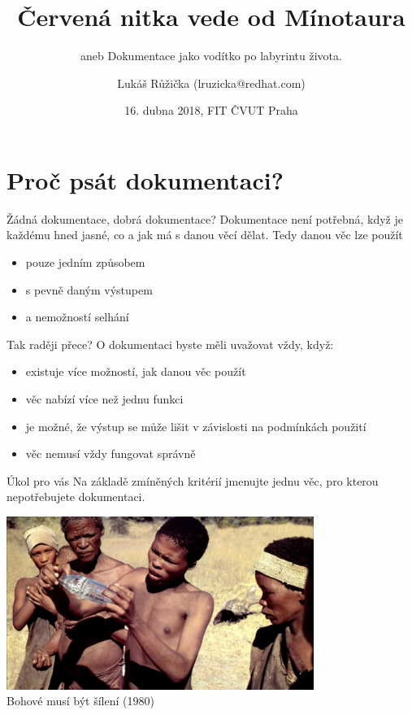 \documentclass[12pt,a4paper]{beamer}
\title{Červená nitka vede od Mínotaura}
\subtitle{aneb Dokumentace jako vodítko po labyrintu života.}
\author{Lukáš Růžička (lruzicka@redhat.com)}
\date{16. dubna 2018, FIT ČVUT Praha}
\begin{document}
	\maketitle
	
    \section{Proč psát dokumentaci?}
    
    	\begin{frame}{Žádná dokumentace, dobrá dokumentace?}
    	  Dokumentace není potřebná, když je každému hned jasné, co a jak má s danou věcí dělat. Tedy danou věc lze použít
    	  
    	  \begin{itemize}
    	  	\item pouze jedním způsobem
    	  	\item s pevně daným výstupem
    	  	\item a nemožností selhání
    	  \end{itemize}
		\end{frame}
	
		\begin{frame}{Tak raději přece?}
		   O dokumentaci byste měli uvažovat vždy, když:
		   \begin{itemize}
		   	\item existuje více možností, jak danou věc použít
		   	\item věc nabízí více než jednu funkci
		   	\item je možné, že výstup se může lišit v závislosti na podmínkách použití
		   	\item věc nemusí vždy fungovat správně
		   \end{itemize}
		\end{frame}
	
		\begin{frame}{Úkol pro vás}
		Na základě zmíněných kritérií jmenujte jednu věc, pro kterou nepotřebujete dokumentaci.
		\end{frame}
	
		\begin{frame}
			\begin{center}
				\includegraphics[width=10cm]{lahev_bohove.jpg}	\\
				Bohové musí být šílení (1980)
			\end{center}
		
		\end{frame}
	
\end{document}
